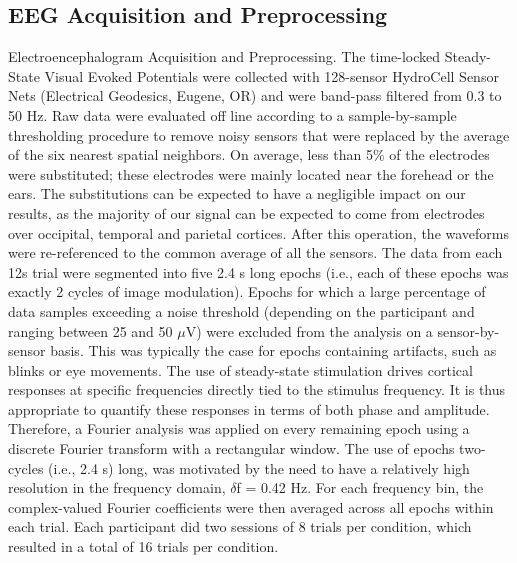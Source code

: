 \documentclass[9pt,twocolumn,twoside,lineno]{pnas-new}
\begin{document}
\subsection*{EEG Acquisition and Preprocessing}
Electroencephalogram Acquisition and Preprocessing. The time-locked Steady-State Visual Evoked Potentials were collected with 128-sensor HydroCell Sensor Nets (Electrical Geodesics, Eugene, OR) and were band-pass filtered from 0.3 to 50 Hz. Raw data were evaluated off line according to a sample-by-sample thresholding procedure to remove noisy sensors that were replaced by the average of the six nearest spatial neighbors. On average, less than 5\% of the electrodes were substituted; these electrodes were mainly located near the forehead or the ears. The substitutions can be expected to have a negligible impact on our results, as the majority of our signal can be expected to come from electrodes over occipital, temporal and parietal cortices. After this operation, the waveforms were re-referenced to the common average of all the sensors. The data from each 12s trial were segmented into five 2.4 s long epochs (i.e., each of these epochs was exactly 2 cycles of image modulation). Epochs for which a large percentage of data samples exceeding a noise threshold (depending on the participant and ranging between 25 and 50 $\mu$V) were excluded from the analysis on a sensor-by-sensor basis. This was typically the case for epochs containing artifacts, such as blinks or eye movements. The use of steady-state stimulation drives cortical responses at specific frequencies directly tied to the stimulus frequency. It is thus appropriate to quantify these responses in terms of both phase and amplitude. Therefore, a Fourier analysis was applied on every remaining epoch using a discrete Fourier transform with a rectangular window. The use of epochs two-cycles (i.e., 2.4 s) long, was motivated by the need to have a relatively high resolution in the frequency domain, $\delta$f = 0.42 Hz. For each frequency bin, the complex-valued Fourier coefficients were then averaged across all epochs within each trial. Each participant did two sessions of 8 trials per condition, which resulted in a total of 16 trials per condition.
\end{document}
